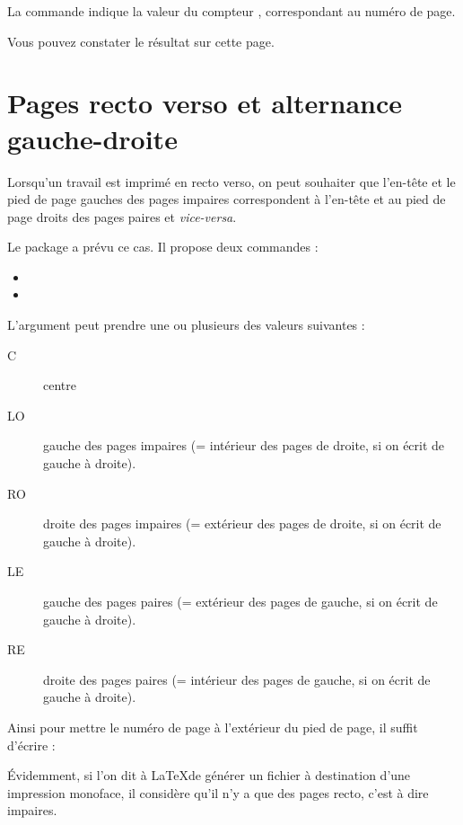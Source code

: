 La commande  indique la valeur du compteur , correspondant au numéro de page.

Vous pouvez constater le résultat sur cette page.\thispagestyle{fancy}\cfoot{{\thepage} / \ref{TotPages}} \renewcommand{\headrulewidth}{0pt}
\fancyhead[LE,RO]{}
\fancyhead[RE]{\leftmark}
\fancyhead[LO]{\rightmark}

\section{Pages recto verso et alternance gauche-droite}

Lorsqu'un travail est imprimé en recto verso, on peut souhaiter que l'en-tête et le pied de page gauches des pages impaires correspondent à l'en-tête et au pied de page droits des pages paires et \emph{vice-versa}.

Le package  a prévu ce cas. Il propose deux commandes : 
\begin{itemize}
\item {}
\item {}
\end{itemize}

L'argument  peut prendre une ou plusieurs des valeurs suivantes :
\begin{description}
\item[C] centre
\item[LO] gauche des pages impaires (= intérieur des pages de droite, si on écrit de gauche à droite).
\item[RO] droite des pages impaires (= extérieur des pages de droite, si on écrit de gauche à droite).
\item[LE] gauche des pages paires (= extérieur des pages  de gauche, si on écrit de gauche à droite).
\item[RE] droite des pages paires (= intérieur des pages de gauche, si on écrit de gauche à droite).
\end{description}

Ainsi pour mettre le numéro de page à l'extérieur du pied de page, il suffit d'écrire :

\begin{latexcode}
\fancyfoot[LE,RO]{\thepage}
\end{latexcode}

Évidemment, si l'on dit à \LaTeX de générer un fichier à destination d'une impression monoface, il considère qu'il n'y a que des pages recto, c'est à dire impaires.

